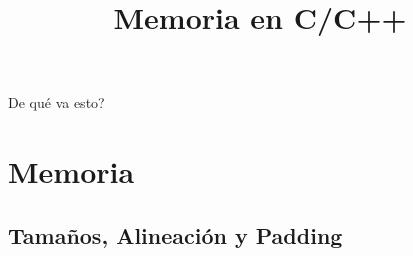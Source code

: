 


\title%
{Memoria en C/C++}

\subject{Memoria en C/C++}



\begin{frame}
   \titlepage
\end{frame}

\begin{frame}{De qu\'e va esto?}
   \tableofcontents
\end{frame}

\section{Memoria}
\subsection{Tama\~nos, Alineaci\'on y Padding}
